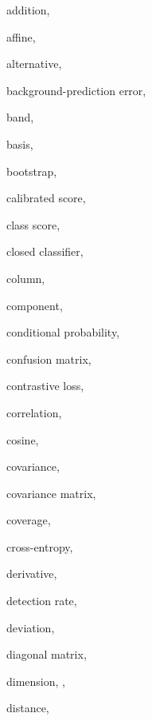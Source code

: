 \documentclass[11pt,a4paper,oneside,openany]{book}
\begin{document}
\renewcommand{\indexname}{Index of defined terms}
\clearpage{}
{}
\begin{theindex}
  \item addition, 
  \item affine, 
  \item alternative, 
  \indexspace
  \item background-prediction error, 
  \item band, 
  \item basis, 
  \item bootstrap, 
  \indexspace
  \item calibrated score, 
  \item class score, 
  \item closed classifier, 
  \item column, 
  \item component, 
  \item conditional probability, 
  \item confusion matrix, 
  \item contrastive loss, 
  \item correlation, 
  \item cosine, 
  \item covariance, 
  \item covariance matrix, 
  \item coverage, 
  \item cross-entropy, 
  \indexspace
  \item derivative, 
  \item detection rate, 
  \item deviation, 
  \item diagonal matrix, 
  \item dimension, , 
  \item distance, 

\end{theindex}
\end{document}
